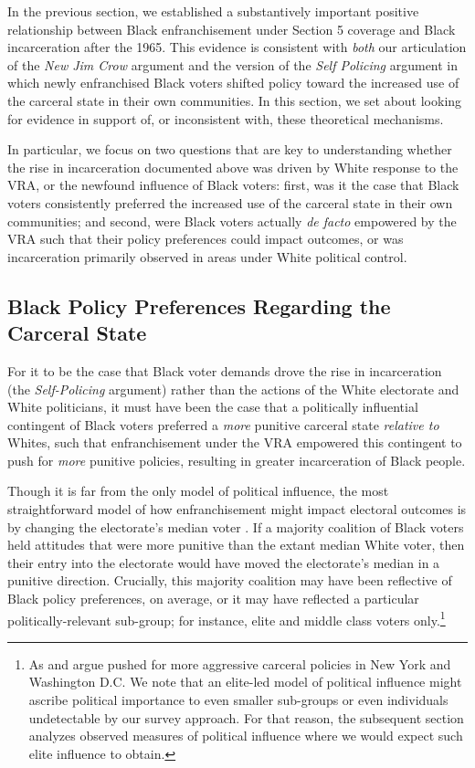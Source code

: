 \documentclass[12pt]{article}
\begin{document}
In the previous section, we established a substantively important positive relationship between Black enfranchisement under Section 5 coverage and Black incarceration after the 1965.  This evidence is consistent with \emph{both} our articulation of the \emph{New Jim Crow} argument and the version of the \emph{Self Policing} argument in which newly enfranchised Black voters shifted policy toward the increased use of the carceral state in their own communities.  In this section, we set about looking for evidence in support of, or inconsistent with, these theoretical mechanisms.

In particular, we focus on two questions that are key to understanding whether the rise in incarceration documented above was driven by White response to the VRA, or the newfound influence of Black voters: first, was it the case that Black voters consistently preferred the increased use of the carceral state in their own communities; and second, were Black voters actually \emph{de facto} empowered by the VRA such that their policy preferences could impact outcomes, or was incarceration primarily observed in areas under White political control.


\subsection*{Black Policy Preferences Regarding the Carceral State}

For it to be the case that Black voter demands drove the rise in incarceration (the \emph{Self-Policing} argument) rather than the actions of the White electorate and White politicians, it must have been the case that a politically influential contingent of Black voters preferred a \emph{more} punitive carceral state \emph{relative to} Whites, such that enfranchisement under the VRA empowered this contingent to push for \emph{more} punitive policies, resulting in greater incarceration of Black people.

Though it is far from the only model of political influence, the most straightforward model of how enfranchisement might impact electoral outcomes is by changing the electorate's median voter \citep{Downs:1957vg}.  If a majority coalition of Black voters held attitudes that were more punitive than the extant median White voter, then their entry into the electorate would have moved the electorate's median in a punitive direction.  Crucially, this majority coalition may have been reflective of Black policy preferences, on average, or it may have reflected a particular politically-relevant sub-group; for instance, elite and middle class voters only.\footnote{As \cite{Fortner:2015uz} and \cite{FormanJr:2017tz} argue pushed for more aggressive carceral policies in New York and Washington D.C.  We note that an elite-led model of political influence might ascribe political importance to even smaller sub-groups or even individuals undetectable by our survey approach.  For that reason, the subsequent section analyzes observed measures of political influence where we would expect such elite influence to obtain.}
\end{document}
